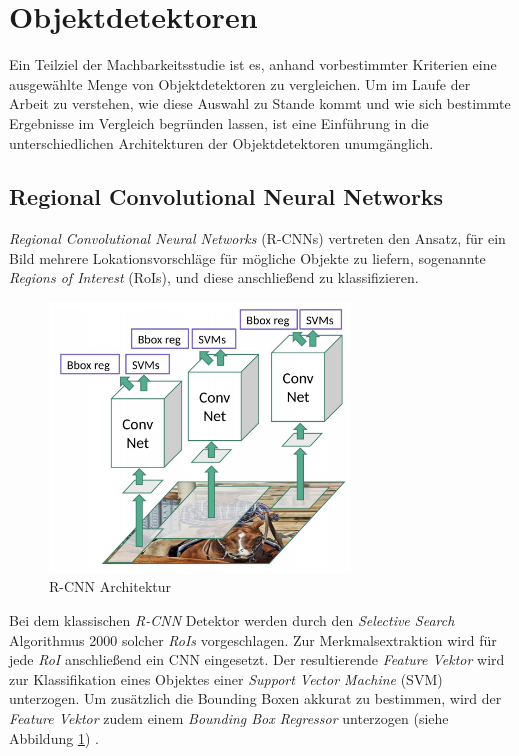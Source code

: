 \section{Objektdetektoren} \label{detection}

Ein Teilziel der Machbarkeitsstudie ist es, anhand vorbestimmter Kriterien eine ausgewählte Menge von Objektdetektoren zu vergleichen. Um im Laufe der Arbeit zu verstehen, wie diese Auswahl zu Stande kommt und wie sich bestimmte Ergebnisse im Vergleich begründen lassen, ist eine Einführung in die unterschiedlichen Architekturen der Objektdetektoren unumgänglich. 

\subsection*{Regional Convolutional Neural Networks}

\textit{Regional Convolutional Neural Networks} (R-CNNs) vertreten den Ansatz, für ein Bild mehrere Lokationsvorschläge für mögliche Objekte zu liefern, sogenannte \textit{Regions of Interest} (RoIs), und diese anschließend zu klassifizieren. 

\begin{figure}[ht]
	\begin{center}
		\includegraphics[width=8cm]{Bilder/rcnn.png} 
		\caption[R-CNN Architektur]{R-CNN Architektur \cite{RohithGandhi.20180709}}
		\label{rcnn}
	\end{center}
\end{figure}

Bei dem klassischen \textit{R-CNN} Detektor werden durch den \textit{Selective Search} Algorithmus 2000 solcher \textit{RoIs} vorgeschlagen. Zur Merkmalsextraktion wird für jede \textit{RoI} anschließend ein CNN eingesetzt. Der resultierende \textit{Feature Vektor} wird zur Klassifikation eines Objektes einer \textit{Support Vector Machine} (SVM) unterzogen. Um zusätzlich die Bounding Boxen akkurat zu bestimmen, wird der \textit{Feature Vektor} zudem einem \textit{Bounding Box Regressor} unterzogen (siehe Abbildung \ref{rcnn}) \cite{RossGirshickJeffDonahueTrevorDarrellJitendraMalik.2016}. 

